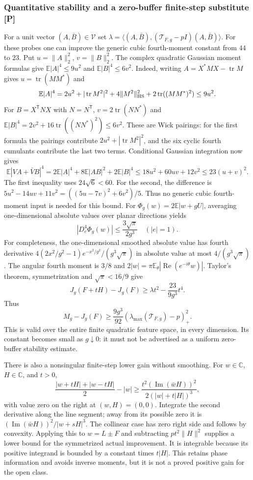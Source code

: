 \subsubsection{Quantitative stability and a zero-buffer finite-step substitute [P]}
For a unit vector $(A,\bar B)\in\mathcal V$ set
$\lambda=\langle(A,\bar B),(\mathcal T_{F,g}-pI)(A,\bar B)\rangle$.
For these probes one can improve the generic cubic fourth-moment constant
from $44$ to $23$. Put $u=\|A\|_2^2$, $v=\|B\|_2^2$. The complex
quadratic Gaussian moment formulas give
$\mathbb E|A|^4\le9u^2$ and $\mathbb E|B|^4\le6v^2$.
Indeed, writing $A=X^*MX-\operatorname{tr}M$ gives $u=\operatorname{tr}(MM^*)$
and
\[
 \mathbb E|A|^4=2u^2+|\operatorname{tr}M^2|^2+
 4\|M^2\|_{\rm HS}^2+2\operatorname{tr}((MM^*)^2)\le9u^2.
\]
For $B=X^{\mathsf T}NX$ with $N=N^{\mathsf T}$,
$v=2\operatorname{tr}(NN^*)$ and
$\mathbb E|B|^4=2v^2+16\operatorname{tr}((NN^*)^2)\le6v^2$.
These are Wick pairings: for the first formula the pairings contribute
$2u^2+|\operatorname{tr}M^2|^2$, and the six cyclic fourth cumulants
contribute the last two terms. Conditional Gaussian integration now gives
\[
 \mathbb E|VA+\bar VB|^4
 =2\mathbb E|A|^4+8\mathbb E|AB|^2+2\mathbb E|B|^4
 \le18u^2+60uv+12v^2\le23(u+v)^2.
\]
The first inequality uses $24\sqrt6<60$. For the second, the difference is
$5u^2-14uv+11v^2=((5u-7v)^2+6v^2)/5$.
Thus no generic cubic fourth-moment input is needed for this bound.
For $\Phi_g(w)=2\mathbb E|w+gU|$, averaging one-dimensional absolute values
over planar directions yields
\[
 |D_e^4\Phi_g(w)|\le\frac{3\sqrt\pi}{2g^3}\quad(|e|=1).
\]
For completeness, the one-dimensional smoothed absolute value has fourth
derivative $4(2x^2/g^2-1)e^{-x^2/g^2}/(g^3\sqrt\pi)$ in absolute value
at most $4/(g^3\sqrt\pi)$. The angular fourth moment is $3/8$ and
$2|w|=\pi\mathbb E_\theta|\operatorname{Re}(e^{-i\theta}w)|$.
Taylor's theorem, symmetrization and $\sqrt\pi<16/9$ give
\[
 J_g(F+tH)-J_g(F)\ge\lambda t^2-\frac{23}{9g^3}t^4.
\]
Thus
\begin{equation}\label{eq:sg-spectral-stability}
 \boxed{M_g-J_g(F)\ge\frac{9g^3}{92}
           (\lambda_{\max}(\mathcal T_{F,g})-p)_+^2.}
\end{equation}
This is valid over the entire finite quadratic feature space, in every
dimension. Its constant becomes small as $g\downarrow0$: it must not be
advertised as a uniform zero-buffer stability estimate.

There is also a nonsingular finite-step lower gain without smoothing.
For $w\in\mathbb C$, $H\in\mathbb C$, and $t>0$,
\[
 \frac{|w+tH|+|w-tH|}{2}-|w|
 \ge\frac{t^2(\operatorname{Im}(\bar wH))^2}
             {2(|w|+t|H|)^3},
\]
with value zero on the right at $(w,H)=(0,0)$. Integrate the second
derivative along the line segment; away from its possible zero it is
$(\operatorname{Im}(\bar wH))^2/|w+sH|^3$. The collinear case has
zero right side and follows by convexity.
Applying this to $w=L\pm F$ and subtracting $pt^2\|H\|^2$ supplies
a lower bound for the symmetrized actual improvement. It is integrable
because its positive integrand is bounded by a constant times $t|H|$.
This retains phase information and avoids inverse moments, but it is
not a proved positive gain for the open class.

